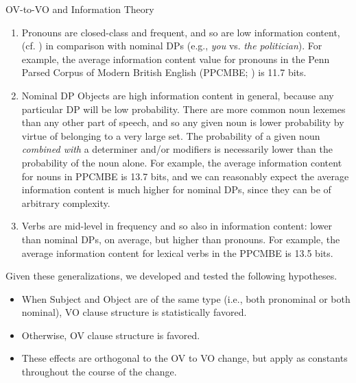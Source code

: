 \documentclass[hyperref={pdfpagelabels=false}]{beamer}
\begin{document}
\begin{frame}{OV-to-VO and Information Theory} 
	
\begin{enumerate}
	\item Pronouns are closed-class and frequent, and so are low information content, (cf. \citealt{shannon1948}) in comparison with nominal DPs (e.g., \textsl{you} vs. \textsl{the politician}). For example, the average information content value for pronouns in the Penn Parsed Corpus of Modern British English (PPCMBE; \citealt{ppcmbe2}) is 11.7 bits.
	\item Nominal DP Objects are high information content in general, because any particular DP will be low probability. There are more common noun lexemes than any other part of speech, and so any given noun is lower probability by virtue of belonging to a very large set. The probability of a given noun \textit{combined with} a determiner and/or modifiers is necessarily lower than the probability of the noun alone. For example, the average information content for nouns in PPCMBE is 13.7 bits, and we can reasonably expect the average information content is much higher for nominal DPs, since they can be of arbitrary complexity.
	\item Verbs are mid-level in frequency and so also in information content: lower than nominal DPs, on average, but higher than pronouns. For example, the average information content for lexical verbs in the PPCMBE is 13.5 bits.
\end{enumerate}

Given these generalizations, we developed and tested the following hypotheses.

\begin{itemize}
	\item When Subject and Object are of the same type (i.e., both pronominal or both nominal), VO clause structure is statistically favored.
	\item Otherwise, OV clause structure is favored.
	\item These effects are orthogonal to the OV to VO change, but apply as constants throughout the course of the change.
\end{itemize}
\end{frame}
\end{document}
